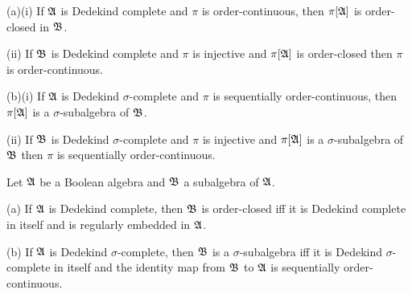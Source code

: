 (a)(i) If $\frak A$ is Dedekind complete and $\pi$ is order-continuous,
then $\pi[\frak A]$ is order-closed in $\frak B$.

\quad(ii) If $\frak B$ is Dedekind complete and $\pi$ is injective and
$\pi[\frak A]$ is order-closed then $\pi$ is order-continuous.

(b)(i) If $\frak A$ is Dedekind $\sigma$-complete and $\pi$ is
sequentially order-continuous, then $\pi[\frak A]$ is a
$\sigma$-subalgebra of $\frak B$.

\quad(ii) If $\frak B$ is Dedekind $\sigma$-complete and $\pi$ is
injective and $\pi[\frak A]$ is a $\sigma$-subalgebra of $\frak B$ then
$\pi$ is sequentially order-continuous.


 Let $\frak A$ be a Boolean algebra and $\frak B$
a subalgebra of $\frak A$.

(a) If $\frak A$ is Dedekind complete, then $\frak B$ is order-closed
iff it is Dedekind complete in itself and is regularly embedded in
$\frak A$.

(b) If $\frak A$ is Dedekind $\sigma$-complete, then $\frak B$ is a
$\sigma$-subalgebra iff it is Dedekind $\sigma$-complete in itself and
the identity map from $\frak B$ to $\frak A$ is sequentially
order-continuous.

